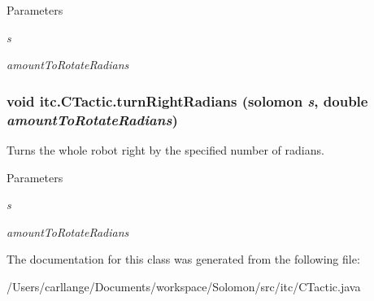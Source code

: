 \begin{DoxyParams}{Parameters}
\item[{\em s}]\item[{\em amountToRotateRadians}]\end{DoxyParams}
\hypertarget{classitc_1_1_c_tactic_a6ec9c0ec24314d590adbd737bbf8be35}{
\subsubsection[{turnRightRadians}]{\setlength{\rightskip}{0pt plus 5cm}void itc.CTactic.turnRightRadians ({\bf solomon} {\em s}, \/  double {\em amountToRotateRadians})}}
\label{classitc_1_1_c_tactic_a6ec9c0ec24314d590adbd737bbf8be35}
Turns the whole robot right by the specified number of radians.


\begin{DoxyParams}{Parameters}
\item[{\em s}]\item[{\em amountToRotateRadians}]\end{DoxyParams}


The documentation for this class was generated from the following file:\begin{DoxyCompactItemize}
\item 
/Users/carllange/Documents/workspace/Solomon/src/itc/CTactic.java\end{DoxyCompactItemize}
